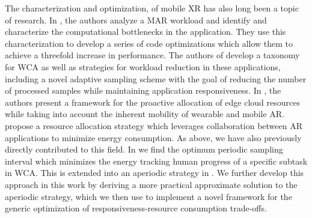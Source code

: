 The characterization and optimization, of mobile \ac{XR} has also long been a topic of research.
In \textcite{srinivasan2009performance}, the authors analyze a \ac{MAR} workload and identify and characterize the computational bottlenecks in the application.
They use this characterization to develop a series of code optimizations which allow them to achieve a threefold increase in performance.
The authors of \textcite{Wang2019Towards} develop a taxonomy for \ac{WCA} as well as strategies for workload reduction in these applications, including a novel adaptive sampling scheme with the goal of reducing the number of processed samples while maintaining application responsiveness.
In \textcite{huang2021proactive}, the authors present a framework for the proactive allocation of edge cloud resources while taking into account the inherent mobility of wearable and mobile \ac{AR}.
\textcite{al2017energy} propose a resource allocation strategy which leverages collaboration between \ac{AR} applications to minimize energy consumption.
As above, we have also previously directly contributed to this field.
In \textcite{Moothedath2021EnergyOptimal,Moothedath2022EnergyEfficient} we find the optimum periodic sampling interval which minimizes the energy tracking human progress of a specific subtask in \ac{WCA}.
This is extended into an aperiodic strategy in \textcite{Moothedath2022Aperiodic}.
We further develop this approach in this work by deriving a more practical approximate solution to the aperiodic strategy, which we then use to implement a novel framework for the generic optimization of responsiveness-resource consumption trade-offs.